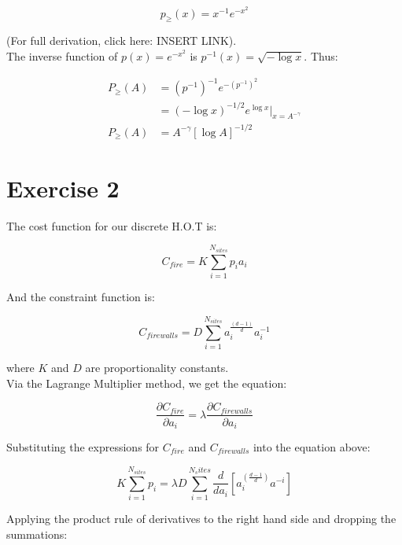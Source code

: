 \documentclass{article}
\begin{document}
\begin{equation}
p_{\geq}(x) = x^{-1}e^{-x^2} 
\end{equation}

(For full derivation, click here: INSERT LINK). \\

The inverse function of $p(x) = e^{-x^2}$ is $p^{-1}(x) = \sqrt{-\log{x}}$. Thus:

\begin{align}
P_{\geq}(A) &= (p^{-1})^{-1}e^{-(p^{-1})^2} \\
&= (-\log{x})^{-1/2}e^{\log{x}} \vert_{x = A^{-\gamma}} \\
P_{\geq}(A) &= A^{-\gamma}[\log{A}]^{-1/2}
\end{align}

\section{Exercise 2}

The cost function for our discrete H.O.T is:

\begin{equation}
C_{fire} = K \sum_{i=1}^{N_{sites}} p_i a_i
\end{equation}

And the constraint function is:

\begin{equation}
C_{firewalls} = D \sum_{i=1}^{N_{sites}} a_i^{\frac{(d-1)}{d}} a_i^{-1}
\end{equation}

where $K$ and $D$ are proportionality constants. \\

Via the Lagrange Multiplier method, we get the equation:

\begin{equation}
\frac{\partial C_{fire}}{\partial a_i} = \lambda \frac{\partial C_{firewalls}}{\partial a_i}
\end{equation}

Substituting the expressions for $C_{fire}$ and $C_{firewalls}$ into the equation above:

\begin{equation}
K \sum_{i=1}^{N_{sites}} p_i = \lambda D \sum_{i=1}^{N_sites} \frac{d}{da_i}[a_i^{(\frac{d-1}{d})}a^{-i}]
\end{equation}

Applying the product rule of derivatives to the right hand side and dropping the summations:
\end{document}
